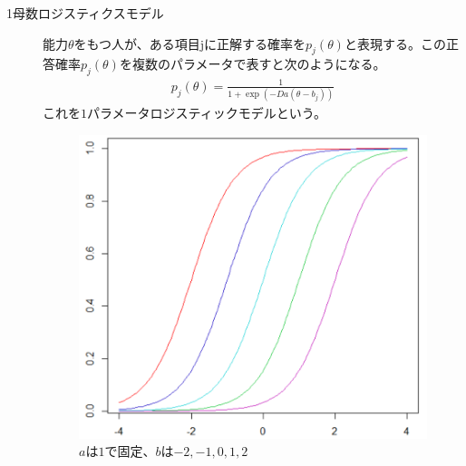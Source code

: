 \documentclass[12pt]{jarticle}
\numberwithin{equation}{subsection}
\begin{document}
\begin{description}
  \item[1母数ロジスティクスモデル] 能力$\theta$をもつ人が、ある項目jに正解する確率を$p_j(\theta)$と表現する。この正答確率$p_j(\theta)$を複数のパラメータで表すと次のようになる。
  \begin{align}
    \displaystyle p_j(\theta) = \frac{1}{1+\exp(-Da(\theta - b_j))}
  \end{align}
  これを$1$パラメータロジスティックモデルという。\vspace{4cm}
  \begin{figure}[H]
    \centering
    \includegraphics[bb = 500 100 1 1,scale = 0.25]{B.png}
    \vspace{1cm}
    \caption{$a$は$1$で固定、$b$は$-2, -1, 0, 1, 2$}
  \end{figure}


\end{description}
\end{document}
